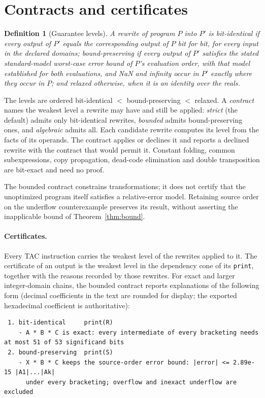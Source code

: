 \documentclass[acmsmall,review,anonymous,nonacm]{acmart}
\newtheorem{definition}{Definition}
\begin{document}
\section{Contracts and certificates}\label{sec:contracts}
\begin{definition}[Guarantee levels]
A rewrite of program $P$ into $P'$ is \emph{bit-identical} if every output of
$P'$ equals the corresponding output of $P$ bit for bit, for every input in the
declared domains; \emph{bound-preserving} if every output of $P'$ satisfies the
stated standard-model worst-case error bound of $P$'s evaluation order,
with that model established for both evaluations, and NaN and infinity
occur in $P'$ exactly where they occur in $P$; and \emph{relaxed}
otherwise, when it is an identity over the reals.
\end{definition}
The levels are ordered bit-identical $<$ bound-preserving $<$ relaxed. A
\emph{contract} names the weakest level a rewrite may have and still be
applied: \emph{strict} (the default) admits only bit-identical rewrites,
\emph{bounded} admits bound-preserving ones, and \emph{algebraic} admits all.
Each candidate rewrite computes its level from the facts of its operands. The
contract applies or declines it and reports a declined rewrite with the
contract that would permit it. Constant folding, common subexpressions, copy
propagation, dead-code elimination and double transposition are bit-exact and
need no proof.

The bounded contract constrains transformations; it does not certify that the
unoptimized program itself satisfies a relative-error model. Retaining source
order on the underflow counterexample preserves its result, without asserting
the inapplicable bound of Theorem~\ref{thm:bound}.

\paragraph{Certificates.} Every TAC instruction carries the weakest level of
the rewrites applied to it. The certificate of an output is the weakest level in
the dependency cone of its \texttt{print}, together with the reasons recorded by
those rewrites. For exact and larger integer-domain chains, the bounded contract
reports explanations of the following form (decimal coefficients in the text
are rounded for display; the exported hexadecimal coefficient is authoritative):
\begin{lstlisting}
 1. bit-identical     print(R)
    - A * B * C is exact: every intermediate of every bracketing needs at most 51 of 53 significand bits
 2. bound-preserving  print(S)
    - X * B * C keeps the source-order error bound: |error| <= 2.89e-15 |A1|...|Ak|
      under every bracketing; overflow and inexact underflow are excluded
\end{lstlisting}
\end{document}
